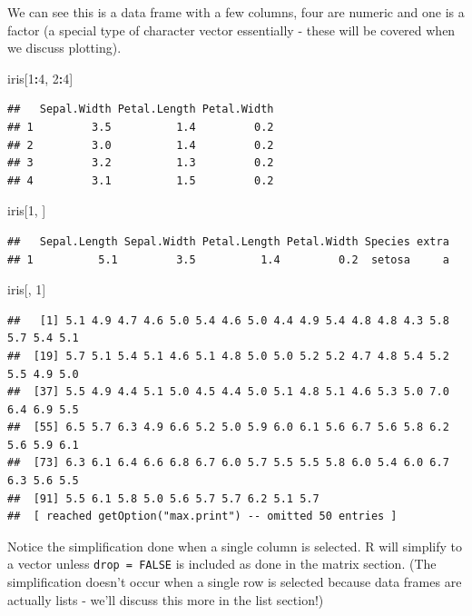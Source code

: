 \documentclass[
]{book}
\newenvironment{Shaded}{\begin{snugshade}}{\end{snugshade}}
\newcommand{\DecValTok}[1]{\textcolor[rgb]{0.00,0.00,0.81}{#1}}
\newcommand{\NormalTok}[1]{#1}
\newcommand{\OperatorTok}[1]{\textcolor[rgb]{0.81,0.36,0.00}{\textbf{#1}}}
\theoremstyle{definition}
\theoremstyle{definition}
\theoremstyle{definition}
\theoremstyle{remark}
\begin{document}
We can see this is a data frame with a few columns, four are numeric and one is a factor (a special type of character vector essentially - these will be covered when we discuss plotting).

\begin{Shaded}
\begin{Highlighting}[]
\NormalTok{iris[}\DecValTok{1}\OperatorTok{:}\DecValTok{4}\NormalTok{, }\DecValTok{2}\OperatorTok{:}\DecValTok{4}\NormalTok{]}
\end{Highlighting}
\end{Shaded}

\begin{verbatim}
##   Sepal.Width Petal.Length Petal.Width
## 1         3.5          1.4         0.2
## 2         3.0          1.4         0.2
## 3         3.2          1.3         0.2
## 4         3.1          1.5         0.2
\end{verbatim}

\begin{Shaded}
\begin{Highlighting}[]
\NormalTok{iris[}\DecValTok{1}\NormalTok{, ]}
\end{Highlighting}
\end{Shaded}

\begin{verbatim}
##   Sepal.Length Sepal.Width Petal.Length Petal.Width Species extra
## 1          5.1         3.5          1.4         0.2  setosa     a
\end{verbatim}

\begin{Shaded}
\begin{Highlighting}[]
\NormalTok{iris[, }\DecValTok{1}\NormalTok{]}
\end{Highlighting}
\end{Shaded}

\begin{verbatim}
##   [1] 5.1 4.9 4.7 4.6 5.0 5.4 4.6 5.0 4.4 4.9 5.4 4.8 4.8 4.3 5.8 5.7 5.4 5.1
##  [19] 5.7 5.1 5.4 5.1 4.6 5.1 4.8 5.0 5.0 5.2 5.2 4.7 4.8 5.4 5.2 5.5 4.9 5.0
##  [37] 5.5 4.9 4.4 5.1 5.0 4.5 4.4 5.0 5.1 4.8 5.1 4.6 5.3 5.0 7.0 6.4 6.9 5.5
##  [55] 6.5 5.7 6.3 4.9 6.6 5.2 5.0 5.9 6.0 6.1 5.6 6.7 5.6 5.8 6.2 5.6 5.9 6.1
##  [73] 6.3 6.1 6.4 6.6 6.8 6.7 6.0 5.7 5.5 5.5 5.8 6.0 5.4 6.0 6.7 6.3 5.6 5.5
##  [91] 5.5 6.1 5.8 5.0 5.6 5.7 5.7 6.2 5.1 5.7
##  [ reached getOption("max.print") -- omitted 50 entries ]
\end{verbatim}

Notice the simplification done when a single column is selected. R will simplify to a vector unless \texttt{drop\ =\ FALSE} is included as done in the matrix section. (The simplification doesn't occur when a single row is selected because data frames are actually lists - we'll discuss this more in the list section!)
\end{document}
